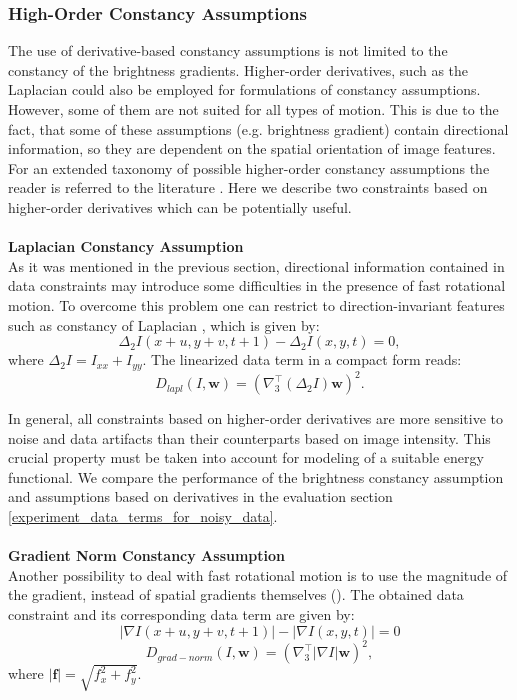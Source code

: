 \subsubsection{High-Order Constancy Assumptions}
\label{high_order_constancy}

The use of derivative-based constancy assumptions is not limited to the constancy of the brightness gradients. Higher-order derivatives, such as the Laplacian could also be employed for formulations of constancy assumptions. However, some of them are not suited for all types of motion. This is due to the fact, that some of these assumptions (e.g. brightness gradient) contain directional information, so they are dependent on the spatial orientation of image features. For an extended taxonomy of possible higher-order constancy assumptions the reader is referred to the literature \cite{Papenberg06}. Here we describe two constraints based on higher-order derivatives which can be potentially useful.
\\
\\
\textbf{Laplacian Constancy Assumption}
\\
As it was mentioned in the previous section, directional information contained in data constraints may introduce some difficulties in the presence of fast rotational motion. To overcome this problem one can restrict to direction-invariant features such as constancy of Laplacian \cite{Papenberg06}, which is given by:
$$ \Delta_{2} I(x+u, y+v, t+1) - \Delta_{2} I(x,y,t) = 0, $$
where $\Delta_{2} I = I_{xx} + I_{yy} $.
The linearized data term in a compact form reads:
$$ D_{lapl}(I,\textbf{w}) = ( \nabla_{3}^{\top}(\Delta_{2}I) \textbf{w})^2.$$

In general, all constraints based on higher-order derivatives are more sensitive to noise and data artifacts than their counterparts based on image intensity. This crucial property must be taken into account for modeling of a suitable energy functional. We compare the performance of the brightness constancy assumption and assumptions based on  derivatives in the evaluation section \ref{experiment_data_terms_for_noisy_data}.
\\
\\
\textbf{Gradient Norm Constancy Assumption}
\\
Another possibility to deal with  fast rotational motion is to use the magnitude of the gradient, instead of spatial gradients themselves (\cite{Papenberg06}).
The obtained data constraint and its corresponding data term are given by:
$$ |\nabla I(x+u, y+v, t+1)| - |\nabla I(x,y,t)| = 0 $$
$$ D_{grad-norm}(I,\textbf{w}) = (\nabla_{3}^{\top}|\nabla I| \textbf{w})^2, $$
where $|\textbf{f}| = \sqrt{f^2_x + f^2_y}$.

